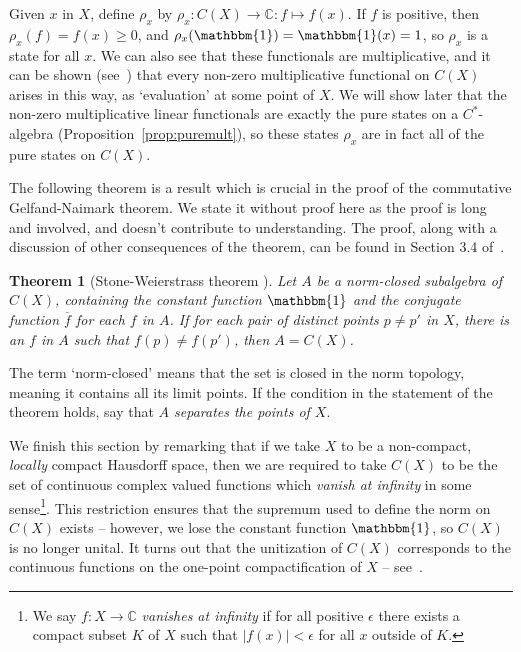 \documentclass[11pt,a4paper]{report}
\theoremstyle{plain}
\newtheorem*{thm*}{Theorem}
\theoremstyle{definition}
\newcommand{\1}{\mathbbm{1}}
\newcommand{\C}{\mathbb{C}}
\newcommand{\CX}{C(X)}
\renewcommand{\bar}{\overline}
\begin{document}
Given $x$ in $X$, define $\rho_x$ by $\rho_x:\CX\to\C:f\mapsto f(x)$. If $f$ is 
positive, then $\rho_x(f) = f(x) \geq 0$, and $\rho_x(\1) = \1(x)=1$, so $\rho_x$ is a 
state for all $x$. We can also see that these functionals are multiplicative, 
and it can be shown (see~\cite[Corollary 3.4.2]{kadison83}) that every non-zero 
multiplicative functional on $\CX$ arises in this way, as `evaluation' at some 
point of $X$. We will show later that the non-zero multiplicative linear 
functionals are exactly the pure states on a $C^\ast$-algebra 
(Proposition~\ref{prop:puremult}), so these states $\rho_x$ are in fact all of 
the pure states on $\CX$.


The following theorem is a result which is crucial in the proof of the commutative 
Gelfand-Naimark theorem. We state it without proof here as the proof is long and 
involved, and doesn't contribute to understanding. The proof, along with a 
discussion of other consequences of the theorem, can be found in Section 3.4 
of~\cite{kadison83}.


\begin{thm*}[Stone-Weierstrass theorem {\cite[3.4.15]{kadison83}}]
	Let $A$ be a norm-closed subalgebra of $\CX$, containing the constant function 
	$\1$ and the conjugate function $\bar f$ for each $f$ in $A$. If for each pair 
	of distinct points $p\not=p'$ in $X$, there is an $f$ in $A$ such that 
	$f(p)\not=f(p')$, then $A=\CX$.

\end{thm*}

The term `norm-closed' means that the set is closed in the norm topology, 
meaning it contains all its limit points. If the condition in the statement of 
the theorem holds, say that \emph{$A$ separates the points of $X$}.


We finish this section by remarking that if we take $X$ to be a non-compact, 
\emph{locally} compact Hausdorff space, then we are required to take $\CX$ to be 
the set of continuous complex valued functions which \emph{vanish at infinity} 
in some sense\footnote{We say $f:X\to\C$ \emph{vanishes at infinity} if for all 
positive $\epsilon$ there exists a compact subset $K$ of $X$ such that 
$\left|f(x)\right|<\epsilon$ for all $x$ outside of $K$.}. This restriction 
ensures that the supremum used to define the norm on $\CX$ exists -- however, we 
lose the constant function $\1$, so $\CX$ is no longer unital. 
It turns out that the unitization of $\CX$ corresponds to the continuous 
functions on the one-point compactification of $X$ -- see~\cite[II.1.2.2]{blackadar06}.
\end{document}
